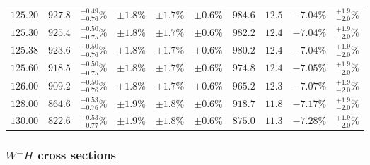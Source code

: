 \begin{table}[ht!]
{{\begin{tabular}{| cc | c | ccc | ccc | c |}
$125.20$ & $927.8$ & $^{+0.49}_{-0.76}\%$ & $\pm 1.8\%$ & {\color{black!55}$\pm 1.7\%$} & {\color{black!55}$\pm 0.6\%$} & $984.6$ & $12.5$ & $-7.04\%$ & $^{+1.9}_{-2.0}\%$ \\
$125.30$ & $925.4$ & $^{+0.50}_{-0.75}\%$ & $\pm 1.8\%$ & {\color{black!55}$\pm 1.7\%$} & {\color{black!55}$\pm 0.6\%$} & $982.2$ & $12.4$ & $-7.04\%$ & $^{+1.9}_{-2.0}\%$ \\
$125.38$ & $923.6$ & $^{+0.50}_{-0.76}\%$ & $\pm 1.8\%$ & {\color{black!55}$\pm 1.7\%$} & {\color{black!55}$\pm 0.6\%$} & $980.2$ & $12.4$ & $-7.04\%$ & $^{+1.9}_{-2.0}\%$ \\
$125.60$ & $918.5$ & $^{+0.50}_{-0.75}\%$ & $\pm 1.8\%$ & {\color{black!55}$\pm 1.7\%$} & {\color{black!55}$\pm 0.6\%$} & $974.8$ & $12.4$ & $-7.05\%$ & $^{+1.9}_{-2.0}\%$ \\
$126.00$ & $909.2$ & $^{+0.50}_{-0.76}\%$ & $\pm 1.8\%$ & {\color{black!55}$\pm 1.7\%$} & {\color{black!55}$\pm 0.6\%$} & $965.2$ & $12.3$ & $-7.07\%$ & $^{+1.9}_{-2.0}\%$ \\
$128.00$ & $864.6$ & $^{+0.53}_{-0.76}\%$ & $\pm 1.9\%$ & {\color{black!55}$\pm 1.8\%$} & {\color{black!55}$\pm 0.6\%$} & $918.7$ & $11.8$ & $-7.17\%$ & $^{+1.9}_{-2.0}\%$ \\
$130.00$ & $822.6$ & $^{+0.53}_{-0.77}\%$ & $\pm 1.9\%$ & {\color{black!55}$\pm 1.8\%$} & {\color{black!55}$\pm 0.6\%$} & $875.0$ & $11.3$ & $-7.28\%$ & $^{+1.9}_{-2.0}\%$ \\
\cline{1-10}
\end{tabular}
}
}
\end{table}



\FloatBarrier
\subsubsection{$W^-H$ cross sections}

